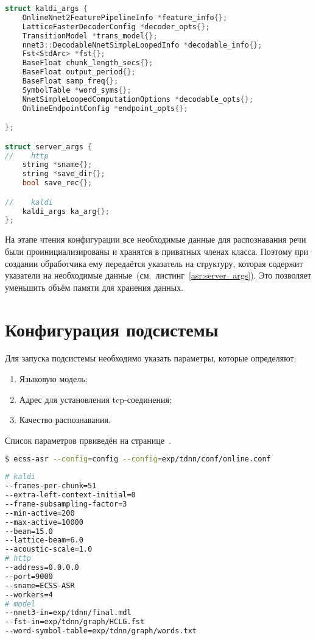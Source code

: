 \begin{lstlisting}[caption={структуры для хранения данных},label={asr:server_args},language=C++]
struct kaldi_args {
    OnlineNnet2FeaturePipelineInfo *feature_info{};
    LatticeFasterDecoderConfig *decoder_opts{};
    TransitionModel *trans_model{};
    nnet3::DecodableNnetSimpleLoopedInfo *decodable_info{};
    Fst<StdArc> *fst{};
    BaseFloat chunk_length_secs{};
    BaseFloat output_period{};
    BaseFloat samp_freq{};
    SymbolTable *word_syms{};
    NnetSimpleLoopedComputationOptions *decodable_opts{};
    OnlineEndpointConfig *endpoint_opts{};

};

struct server_args {
//    http
    string *sname{};
    string *save_dir{};
    bool save_rec{};

//    kaldi
    kaldi_args ka_arg{};
};

\end{lstlisting}

На этапе чтения конфигурации все необходимые данные для распознавания речи
были проинициализированы и хранятся в приватных членах класса. Поэтому при
создании обработчика ему передаётся указатель на структуру, которая содержит
указатели на необходимые данные~(см.~листинг~\ref{asr:server_args}). Это позволяет
уменьшить объём памяти для хранения данных.


\section{Конфигурация подсистемы}

Для запуска подсистемы необходимо указать параметры, которые определяют:
\begin{enumerate}
    \item Языковую модель;
    \item Адрес для установления tcp-соединения;
    \item Качество распознавания.
\end{enumerate}

Список параметров првиведён на странице~\pageref{kaldi:options}.
\begin{lstlisting}[caption={Запуск ASR},label={asr:run},language=bash]
$ ecss-asr --config=config --config=exp/tdnn/conf/online.conf

\end{lstlisting}

\begin{lstlisting}[caption={Содежимое config},label={asr:config},language=bash]
# kaldi
--frames-per-chunk=51
--extra-left-context-initial=0
--frame-subsampling-factor=3
--min-active=200
--max-active=10000
--beam=15.0
--lattice-beam=6.0
--acoustic-scale=1.0
# http
--address=0.0.0.0
--port=9000
--sname=ECSS-ASR
--workers=4
# model
--nnet3-in=exp/tdnn/final.mdl
--fst-in=exp/tdnn/graph/HCLG.fst
--word-symbol-table=exp/tdnn/graph/words.txt

\end{lstlisting}


